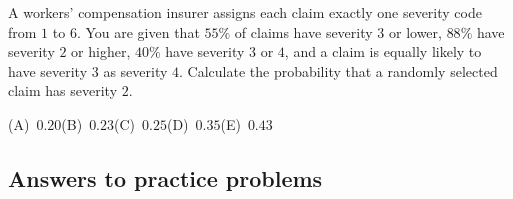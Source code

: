 \begin{practice}
A workers' compensation insurer assigns each claim exactly one severity code from $1$ to
$6$. You are given that $55\%$ of claims have severity $3$ or lower, $88\%$ have severity
$2$ or higher, $40\%$ have severity $3$ or $4$, and a claim is equally likely to have
severity $3$ as severity $4$. Calculate the probability that a randomly selected claim has
severity $2$.

\smallskip\noindent (A)~$0.20$\hfill (B)~$0.23$\hfill (C)~$0.25$\hfill (D)~$0.35$\hfill (E)~$0.43$\hfill\mbox{}
\end{practice}

\subsection{Answers to practice problems}

